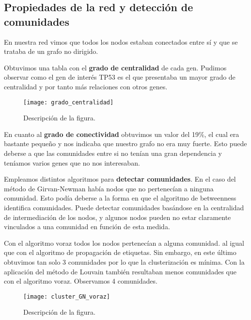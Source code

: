\subsection{Propiedades de la red y detección de comunidades}

En nuestra red vimos que todos los nodos estaban conectados entre sí y que se trataba de un grafo no dirigido.

\vspace{3pt}

Obtuvimos una tabla con el \textbf{grado de centralidad} de cada gen. Pudimos observar como el gen de interés TP53 es el que presentaba un mayor grado de centralidad y por tanto más relaciones con otros genes. 
\begin{figure}
	\centering
	\texttt{[image: grado\_centralidad]}
	\caption{Descripción de la figura.}
	\label{fig:grado_centralidad}
\end{figure}


\vspace{3pt}

En cuanto al \textbf{grado de conectividad} obtuvimos un valor del 19\%, el cual era bastante pequeño y nos indicaba que nuestro grafo no era muy fuerte. Esto puede deberse a que las comunidades entre si no tenían una gran dependencia y teníamos varios genes que no nos interesaban. 

\vspace{3pt}

Empleamos distintos algoritmos para \textbf{detectar comunidades}. En el caso del método de Girvan-Newman había nodos que no pertenecían a ninguna comunidad. Esto podía deberse a la forma en que el algoritmo de betweenness identifica comunidades. Puede detectar comunidades basándose en la centralidad de intermediación de los nodos, y algunos nodos pueden no estar claramente vinculados a una comunidad en función de esta medida.

\vspace{3pt}

Con el algoritmo voraz todos los nodos pertenecían a alguna comunidad. al igual que con el algoritmo de propagación de etiquetas. Sin embargo, en este último obtuvimos tan solo 3 comunidades por lo que la clusterización es mínima.  Con la aplicación del método de Louvain también resultaban menos comunidades que con el algoritmo voraz. Observamos 4 comunidades. 

\begin{figure}
	\centering
	\texttt{[image: cluster\_GN\_voraz]}
	\caption{Descripción de la figura.}
	\label{fig:cluster_GN_voraz}
\end{figure} 

